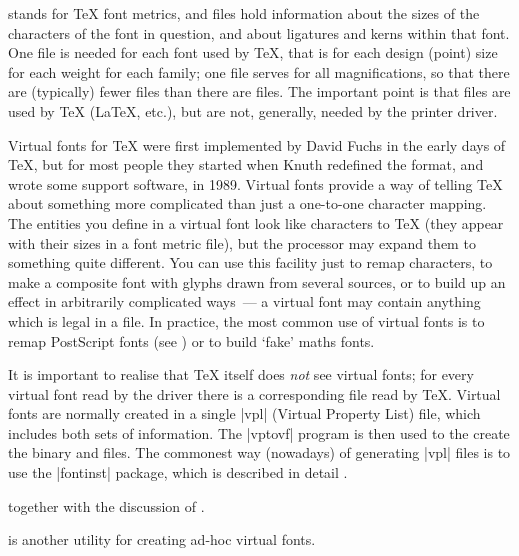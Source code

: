 
 stands for \TeX{} font metrics, and  files hold
information about the sizes of the characters of the font in question,
and about ligatures and kerns within that font.  One  file is
needed for each font used by \TeX{}, that is for each design (point)
size for each weight for each family; one  file serves for all
magnifications, so that there are (typically) fewer  files than
there are  files.  The important point is that  files are
used by \TeX{} (\LaTeX{}, etc.), but are not, generally, needed by the
printer driver.



Virtual fonts for \TeX{} were first implemented by David Fuchs in the
early days of \TeX{}, but for most people they started when Knuth
redefined the format, and wrote some support software, in 1989.
Virtual fonts provide a way of telling \TeX{} about something more
complicated than just a one-to-one character mapping. The entities you
define in a virtual font look like characters to \TeX{} (they appear
with their sizes in a font metric file), but the  processor may
expand them to something quite different. You can use this facility
just to remap characters, to make a composite font with glyphs drawn
from several sources, or to build up an effect in arbitrarily
complicated ways~--- a virtual font may contain anything which is
legal in a  file.
In practice, the most common use of virtual fonts is to remap
PostScript fonts (see ) or to
build `fake' maths fonts.

It is important to realise that \TeX{} itself does \emph{not} see
virtual fonts; for every virtual font read by the  driver there
is a corresponding  file read by \TeX{}. Virtual fonts are normally
created in a single  |vpl| (Virtual Property List) file, which
includes both sets of information. The \ProgName|vptovf| program is
then used to the create the binary  and  files.  The
commonest way (nowadays) of generating |vpl| files is to use the
\ProgName|fontinst| package, which is described in detail
\htmlignore
{}.
\endhtmlignore
\begin{htmlversion}
together with the discussion of
.
\end{htmlversion}
 is another utility for creating ad-hoc virtual
fonts.

